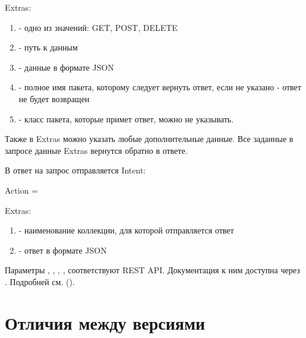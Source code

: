 \documentclass[a4paper,10pt,russian]{sphinxmanual}
\begin{document}
Extras:
\begin{enumerate}
\def\theenumi{\arabic{enumi}}
\def\labelenumi{\theenumi .}
\makeatletter\def\p@enumii{\p@enumi \theenumi .}\makeatother
\item {} 
 - одно из значений: GET, POST, DELETE

\item {} 
 - путь к данным

\item {} 
 - данные в формате JSON

\item {} 
 - полное имя пакета, которому следует вернуть ответ, если не указано - ответ не будет возвращен

\item {} 
 - класс пакета, которые примет ответ, можно не указывать.

\end{enumerate}

Также в Extras можно указать любые дополнительные данные. Все заданные в запросе данные Extras вернутся обратно  в ответе.

В ответ на запрос отправляется Intent:

Action = 

Extras:
\begin{enumerate}
\def\theenumi{\arabic{enumi}}
\def\labelenumi{\theenumi .}
\makeatletter\def\p@enumii{\p@enumi \theenumi .}\makeatother
\item {} 
 - наименование коллекции, для которой отправляется ответ

\item {} 
 - ответ в формате JSON

\end{enumerate}

Параметры , , , ,  соответствуют REST API. Документация к ним доступна через .
Подробней см. {\hyperref[\detokenize{api:sub-chapter-rest-api}]{}} ().


\chapter{Отличия между версиями}
\label{\detokenize{versions:chapter-versions}}\label{\detokenize{versions:id1}}\label{\detokenize{versions::doc}}
\end{document}
